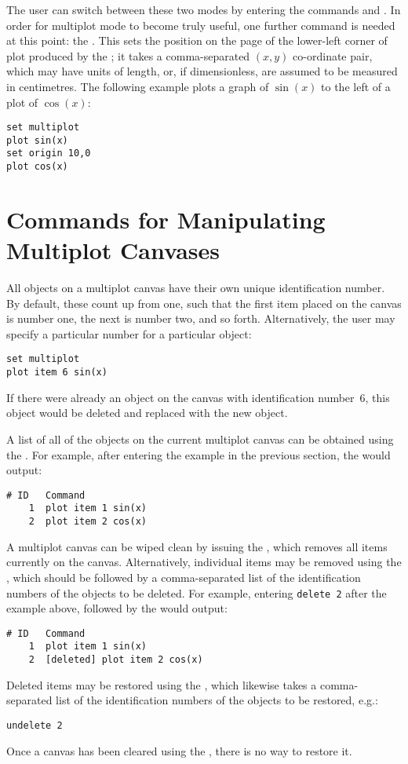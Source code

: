 The user can switch between these two modes by entering the commands
 and .  In order for
multiplot mode to become truly useful, one further command is needed at this
point: the .  This sets the position on the page of the
lower-left corner of plot produced by the ; it takes a
comma-separated $(x,y)$ co-ordinate pair, which may have units of length, or,
if dimensionless, are assumed to be measured in centimetres. The following
example plots a graph of $\sin(x)$ to the left of a plot of $\cos(x)$:
\begin{verbatim} 
set multiplot
plot sin(x)
set origin 10,0
plot cos(x)
\end{verbatim}

\section{Commands for Manipulating Multiplot Canvases}

All objects on a multiplot canvas have their own unique identification number.
By default, these count up from one, such that the first item placed on the
canvas is number one, the next is number two, and so forth. Alternatively, the
user may specify a particular number for a particular object:
\begin{verbatim} 
set multiplot
plot item 6 sin(x)
\end{verbatim}
If there were already an object on the canvas with identification number~6,
this object would be deleted and replaced with the new object.

A list of all of the objects on the current multiplot canvas can be obtained
using the . For example, after entering the example in the
previous section, the  would output:
\begin{verbatim}
# ID   Command
    1  plot item 1 sin(x)
    2  plot item 2 cos(x)
\end{verbatim}

A multiplot canvas can be wiped clean by issuing the , which
removes all items currently on the canvas. Alternatively, individual items may
be removed using the , which should be followed by a
comma-separated list of the identification numbers of the objects to be
deleted. For example, entering {\tt delete 2} after the example above, followed
by the  would output:
\begin{verbatim}
# ID   Command
    1  plot item 1 sin(x)
    2  [deleted] plot item 2 cos(x)
\end{verbatim}
Deleted items may be restored using the , which likewise
takes a comma-separated list of the identification numbers of the objects to be
restored, e.g.:
\begin{verbatim}
undelete 2
\end{verbatim}
Once a canvas has been cleared using the , there is no way to
restore it.

